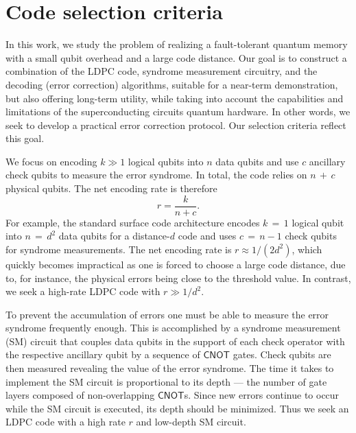 \documentclass{article}
\newcommand{\Gate}[1]{\mathsf{#1}}
\newcommand{\cnotgate}{\Gate{CNOT}}
\begin{document}
 




\section{Code selection criteria}

In this work, we study the problem of realizing a fault-tolerant quantum memory with a small qubit overhead and a large code distance.  Our goal is to construct a combination of the LDPC code, syndrome measurement circuitry, and the decoding (error correction) algorithms, suitable for a near-term demonstration, but also offering long-term utility, while taking into account the capabilities and limitations of the superconducting circuits quantum hardware.  In other words, we seek to develop a practical error correction protocol.  Our selection criteria reflect this goal.

We focus on encoding $k\gg 1$ logical qubits into  
$n$ data qubits and use $c$ ancillary check qubits to measure the error syndrome.
In total, the code relies on $n\,{+}\,c$ physical qubits. The net encoding rate 
 is therefore
\[
r=\frac{k}{n+c}.
\]
For example, the standard surface code architecture encodes $k\,{=}\,1$ logical qubit into $n\,{=}\,d^2$ data qubits for a distance-$d$ code and uses $c\,{=}\,n{-}1$ check qubits for syndrome measurements.
The net encoding rate is $r\approx 1/(2d^2)$, which quickly becomes impractical as one is forced to choose a large code distance, due to, for instance, the physical errors being close to the threshold value.  In contrast, we seek a high-rate LDPC code with $r\gg 1/d^2$.

To prevent the accumulation of errors one must be able to  measure the 
error syndrome   frequently enough. This is accomplished by a syndrome measurement (SM) circuit that couples data qubits in the support of each check operator with the respective ancillary qubit by a sequence of $\cnotgate$ gates.
Check qubits are then measured revealing the value of the error syndrome.
The time it takes to implement the SM circuit is proportional to its depth
— the number of gate layers composed of non-overlapping $\cnotgate$s.
Since new errors continue to occur while the SM circuit is executed, its depth
should be minimized.
Thus we seek an LDPC code with a high rate $r$ and low-depth SM circuit.
\end{document}
